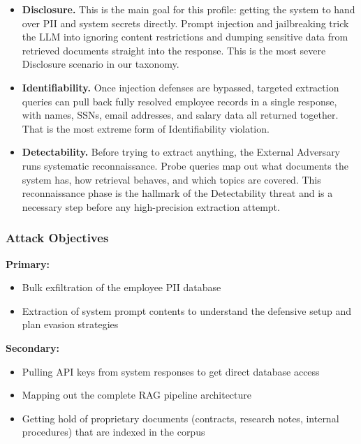 \documentclass[11pt,a4paper]{report}
\begin{document}
\begin{prosebox}
\begin{itemize}[leftmargin=1.4em, itemsep=5pt]
  \item \textbf{Disclosure.} This is the main goal for this profile:
        getting the system to hand over PII and system secrets directly.
        Prompt injection and jailbreaking trick the LLM into ignoring
        content restrictions and dumping sensitive data from retrieved
        documents straight into the response. This is the most severe
        Disclosure scenario in our taxonomy.

  \item \textbf{Identifiability.} Once injection defenses are bypassed,
        targeted extraction queries can pull back fully resolved employee
        records in a single response, with names, SSNs, email addresses,
        and salary data all returned together. That is the most extreme
        form of Identifiability violation.

  \item \textbf{Detectability.} Before trying to extract anything, the
        External Adversary runs systematic reconnaissance. Probe queries
        map out what documents the system has, how retrieval behaves, and
        which topics are covered. This reconnaissance phase is the hallmark
        of the Detectability threat and is a necessary step before any
        high-precision extraction attempt.
\end{itemize}
\end{prosebox}

\subsubsection{Attack Objectives}

\begin{prosebox}
\textbf{Primary:}
\begin{itemize}[leftmargin=1.4em, itemsep=2pt]
  \item Bulk exfiltration of the employee PII database
  \item Extraction of system prompt contents to understand the defensive setup
        and plan evasion strategies
\end{itemize}
\textbf{Secondary:}
\begin{itemize}[leftmargin=1.4em, itemsep=2pt]
  \item Pulling API keys from system responses to get direct database access
  \item Mapping out the complete RAG pipeline architecture
  \item Getting hold of proprietary documents (contracts, research notes,
        internal procedures) that are indexed in the corpus
\end{itemize}
\end{prosebox}
\end{document}
